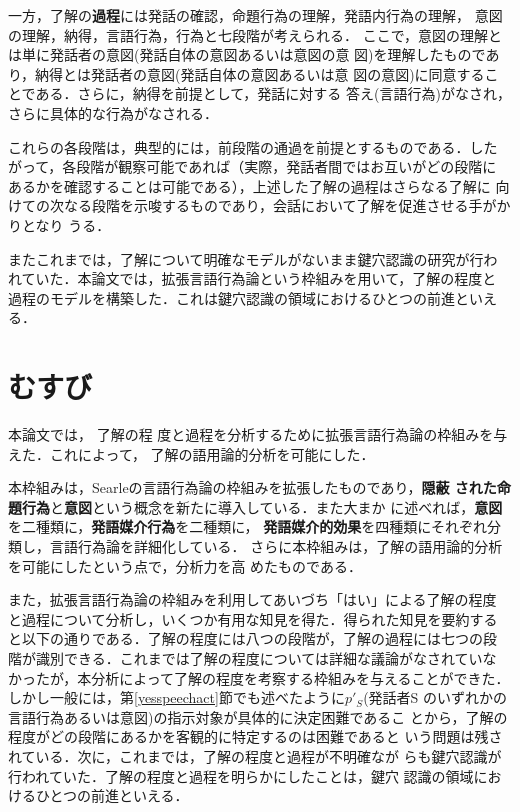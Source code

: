 一方，了解の{\bf 過程}には発話の確認，命題行為の理解，発語内行為の理解，
意図の理解，納得，言語行為，行為と七段階が考えられる．
ここで，意図の理解とは単に発話者の意図(発話自体の意図あるいは意図の意
図)を理解したものであり，納得とは発話者の意図(発話自体の意図あるいは意
図の意図)に同意することである．さらに，納得を前提として，発話に対する
答え(言語行為)がなされ，さらに具体的な行為がなされる．

これらの各段階は，典型的には，前段階の通過を前提とするものである．した
がって，各段階が観察可能であれば（実際，発話者間ではお互いがどの段階に
あるかを確認することは可能である），上述した了解の過程はさらなる了解に
向けての次なる段階を示唆するものであり，会話において了解を促進させる手がかりとなり
うる．

またこれまでは，了解について明確なモデルがないまま鍵穴認識の研究が行わ
れていた．本論文では，拡張言語行為論という枠組みを用いて，了解の程度と
過程のモデルを構築した．これは鍵穴認識の領域におけるひとつの前進といえ
る．

\section{むすび}

本論文では，
了解の程
度と過程を分析するために拡張言語行為論の枠組みを与えた．これによって，
了解の語用論的分析を可能にした．

本枠組みは，Searleの言語行為論の枠組みを拡張したものであり，{\bf 隠蔽
された命題行為}と{\bf 意図}という概念を新たに導入している．また大まか
に述べれば，{\bf 意図}を二種類に，{\bf 発語媒介行為}を二種類に，{\bf 
発語媒介的効果}を四種類にそれぞれ分類し，言語行為論を詳細化している．
さらに本枠組みは，了解の語用論的分析を可能にしたという点で，分析力を高
めたものである．

また，拡張言語行為論の枠組みを利用してあいづち「はい」による了解の程度
と過程について分析し，いくつか有用な知見を得た．得られた知見を要約する
と以下の通りである．了解の程度には八つの段階が，了解の過程には七つの段
階が識別できる．これまでは了解の程度については詳細な議論がなされていな
かったが，本分析によって了解の程度を考察する枠組みを与えることができた．
しかし一般には，第\ref{yesspeechact}節でも述べたように$p'_{S}$(発話者S
のいずれかの言語行為あるいは意図)の指示対象が具体的に決定困難であるこ
とから，了解の程度がどの段階にあるかを客観的に特定するのは困難であると
いう問題は残されている．次に，これまでは，了解の程度と過程が不明確なが
らも鍵穴認識が行われていた．了解の程度と過程を明らかにしたことは，鍵穴
認識の領域におけるひとつの前進といえる．

